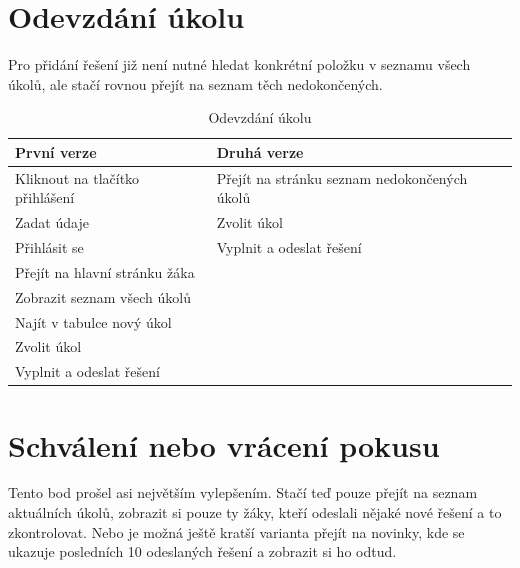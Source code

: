 \documentclass[twoside]{ctuthesis}
\theoremstyle{plain}
\theoremstyle{definition}
\theoremstyle{note}
\begin{document}
\section{Odevzdání úkolu}
Pro přidání řešení již není nutné hledat konkrétní položku v seznamu všech úkolů, ale stačí rovnou přejít na seznam těch nedokončených.

\begin{table}[H]
    \centering
    \begin{tabular}{ |p{}|p{}| } 
        \hline
        \rowcolor{tabledarkblue}
        První verze & Druhá verze\\
        \hline
        Kliknout na tlačítko přihlášení & Přejít na stránku seznam nedokončených úkolů \\ 
        Zadat údaje & Zvolit úkol \\ 
        Přihlásit se & Vyplnit a odeslat řešení\\ 
        Přejít na hlavní stránku žáka & \\
        Zobrazit seznam všech úkolů & \\
        Najít v tabulce nový úkol & \\
        Zvolit úkol & \\
        Vyplnit a odeslat řešení & \\
        \hline
    \end{tabular}
    \caption{Odevzdání úkolu}
    \label{table:submitAttempt}
\end{table}


\section{Schválení nebo vrácení pokusu}
Tento bod prošel asi největším vylepšením. Stačí teď pouze přejít na seznam aktuálních úkolů, zobrazit si pouze ty žáky, kteří odeslali nějaké nové řešení a to zkontrolovat. Nebo je možná ještě kratší varianta přejít na novinky, kde se ukazuje posledních 10 odeslaných řešení a zobrazit si ho odtud.
\end{document}
